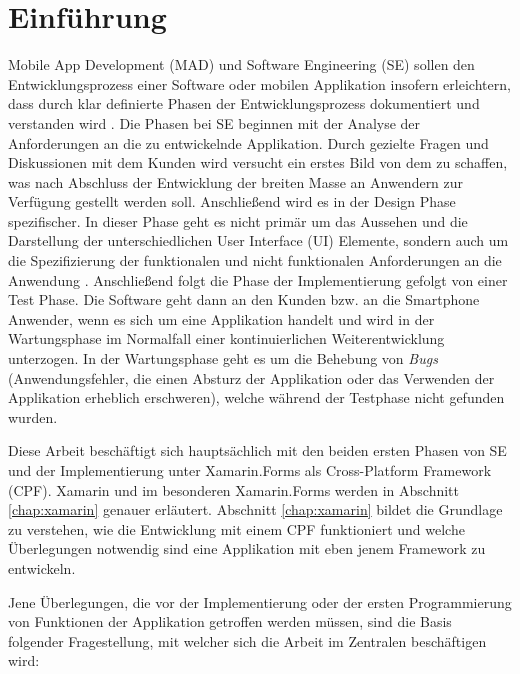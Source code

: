 %
%
% 
% 

\chapter{Einführung}
\label{chap:intro}
	Mobile App Development (MAD) und Software Engineering (SE) sollen den Entwicklungsprozess einer Software oder mobilen Applikation insofern erleichtern, dass durch klar definierte Phasen der Entwicklungsprozess dokumentiert und verstanden wird \cite{Anthony2010}. Die Phasen bei SE beginnen mit der Analyse der Anforderungen an die zu entwickelnde Applikation. Durch gezielte Fragen und Diskussionen mit dem Kunden wird versucht ein erstes Bild von dem zu schaffen, was nach Abschluss der Entwicklung der breiten Masse an Anwendern zur Verfügung gestellt werden soll. Anschließend wird es in der Design Phase spezifischer. In dieser Phase geht es nicht primär um das Aussehen und die Darstellung der unterschiedlichen User Interface (UI) Elemente, sondern auch um die Spezifizierung der funktionalen und nicht funktionalen Anforderungen an die Anwendung \cite{Anthony2010}. Anschließend folgt die Phase der Implementierung gefolgt von einer Test Phase. Die Software geht dann an den Kunden bzw. an die Smartphone Anwender, wenn es sich um eine Applikation handelt und wird in der Wartungsphase im Normalfall einer kontinuierlichen Weiterentwicklung unterzogen. In der Wartungsphase geht es um die Behebung von \textit{Bugs} (Anwendungsfehler, die einen Absturz der Applikation oder das Verwenden der Applikation erheblich erschweren), welche während der Testphase nicht gefunden wurden. 

	Diese Arbeit beschäftigt sich hauptsächlich mit den beiden ersten Phasen von SE und der Implementierung unter Xamarin.Forms als Cross-Platform Framework (CPF). Xamarin und im besonderen Xamarin.Forms werden in Abschnitt \ref{chap:xamarin} genauer erläutert. Abschnitt \ref{chap:xamarin} bildet die Grundlage zu verstehen, wie die Entwicklung mit einem CPF funktioniert und welche Überlegungen notwendig sind eine Applikation mit eben jenem Framework zu entwickeln.

	Jene Überlegungen, die vor der Implementierung oder der ersten Programmierung von Funktionen der Applikation getroffen werden müssen, sind die Basis folgender Fragestellung, mit welcher sich die Arbeit im Zentralen beschäftigen wird:\vspace{1cm}


